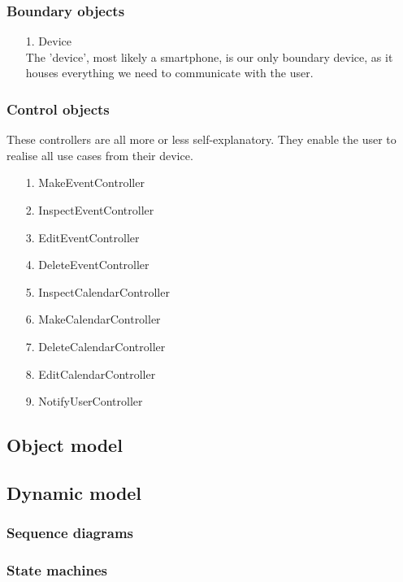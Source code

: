 \subsubsection{Boundary objects}

\begin{enumerate}
	\item[1.] Device \hfill \\
	The 'device', most likely a smartphone, is our only boundary device, as it houses everything we need to communicate with the user.
\end{enumerate}

\subsubsection{Control objects}

These controllers are all more or less self-explanatory. They enable the user to realise all use cases from their device.

\begin{enumerate}
	\item[1.] MakeEventController
	\item[2.] InspectEventController
	\item[3.] EditEventController 
	\item[4.] DeleteEventController
	\item[5.] InspectCalendarController
	\item[6.] MakeCalendarController
	\item[7.] DeleteCalendarController
	\item[8.] EditCalendarController 
	\item[9.] NotifyUserController 
\end{enumerate}

\subsection{Object model}



\subsection{Dynamic model}



\subsubsection{Sequence diagrams}



\subsubsection{State machines}



\newpage
